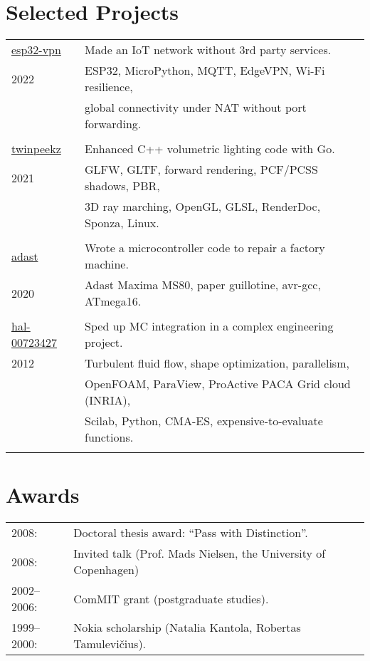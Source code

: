 \documentclass[a4paper,11pt]{article}
\begin{document}
\section*{Selected Projects}
\label{sect:pubs}

\begin{tabular}{ll}
\href{https://github.com/aabbtree77/esp32-vpn}{esp32-vpn} & Made an IoT network without 3rd party services.\\
               2022    & ESP32, MicroPython, MQTT, EdgeVPN, Wi-Fi resilience,\\
                       & global connectivity under NAT without port forwarding.\\
                       &\\
\href{https://github.com/aabbtree77/twinpeekz}{twinpeekz}    & Enhanced C++ volumetric lighting code with Go.\\
                   2021       & GLFW, GLTF, forward rendering, PCF/PCSS shadows, PBR, \\
                          & 3D ray marching, OpenGL, GLSL, RenderDoc, Sponza, Linux.\\
                          &\\
\href{https://github.com/aabbtree77/adast}{adast} & Wrote a microcontroller code to repair a factory machine. \\
2020 & Adast Maxima MS80, paper guillotine, avr-gcc, ATmega16. \\
     &\\                        
\href{https://hal.archives-ouvertes.fr/hal-00723427}{hal-00723427} & Sped up MC integration in a complex engineering project.\\
                     2012 & Turbulent fluid flow, shape optimization, parallelism, \\             
                     & OpenFOAM, ParaView, ProActive PACA Grid cloud (INRIA),\\
                                  & Scilab, Python, CMA-ES, expensive-to-evaluate functions.\\
                          &  \\        
\end{tabular}

%


%
%
\section*{Awards}
%
\begin{tabular}{ll}
        2008: & Doctoral thesis award: “Pass with Distinction”.\\
        2008: & Invited talk (Prof. Mads Nielsen, the University of Copenhagen)\\
        2002--2006:& ComMIT grant (postgraduate studies).\\
        1999--2000:& Nokia scholarship (Natalia Kantola, Robertas Tamulevi\v{c}ius).
\end{tabular}
%
%

\end{document}
